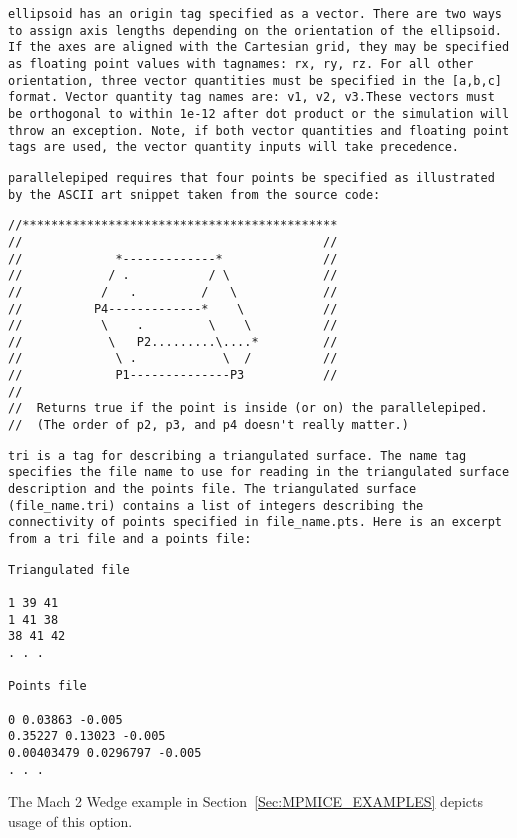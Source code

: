 \tt ellipsoid \normalfont has an origin tag specified as a vector.  There are 
two ways to assign axis lengths depending on the orientation of the ellipsoid.
If the axes are aligned with the Cartesian grid, they may be specified as 
floating point values with tagnames: rx, ry, rz.  For all other orientation, 
three vector quantities must be specified in the \tt [a,b,c] \normalfont format.
Vector quantity tag names are: v1, v2, v3.These vectors must be orthogonal 
to within 1e-12 after dot product or the simulation will throw an exception.  
Note, if both vector quantities and floating point tags are used, 
the vector quantity inputs will take precedence.  

\tt parallelepiped \normalfont requires that four points be specified as
illustrated by the ASCII art snippet taken from the source code:

\begin{Verbatim}[fontsize=\footnotesize]
//********************************************
//                                          //
//             *-------------*              //
//            / .           / \             //
//           /   .         /   \            //
//          P4-------------*    \           //
//           \    .         \    \          //
//            \   P2.........\....*         //
//             \ .            \  /          //
//             P1--------------P3           //
//
//  Returns true if the point is inside (or on) the parallelepiped.
//  (The order of p2, p3, and p4 doesn't really matter.)
\end{Verbatim}

\tt tri \normalfont is a tag for describing a triangulated surface.
The name tag specifies the file name to use for reading in the
triangulated surface description and the points file.  The
triangulated surface (file\_name.tri) contains a list of integers
describing the connectivity of points specified in file\_name.pts.
Here is an excerpt from a tri file and a points file:

\begin{Verbatim}[fontsize=\footnotesize]
Triangulated file

1 39 41
1 41 38
38 41 42
. . .

Points file

0 0.03863 -0.005
0.35227 0.13023 -0.005
0.00403479 0.0296797 -0.005
. . .
\end{Verbatim}
The Mach 2 Wedge example in Section~\ref{Sec:MPMICE_EXAMPLES} depicts usage of
this option.

